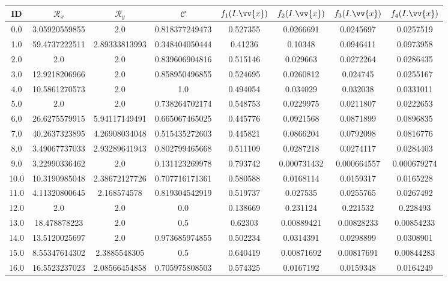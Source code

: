 \scriptsize
\begin{longtable}{|c|c|c|c|c|c|c|c|}
\hline
ID & $\mathscr{R}_x$ & $\mathscr{R}_y$ & $\mathscr{C}$ & $f_1(I.\vv{x})$ & $f_2(I.\vv{x})$ & $f_3(I.\vv{x})$ & $f_4(I.\vv{x})$ \\
\hline
0.0 & 3.05920559855 & 2.0 & 0.818377249473 & 0.527355 & 0.0266691 & 0.0245697 & 0.0257519 \\
1.0 & 59.4737222511 & 2.89333813993 & 0.348404050444 & 0.41236 & 0.10348 & 0.0946411 & 0.0973958 \\
2.0 & 2.0 & 2.0 & 0.839606904816 & 0.515146 & 0.029663 & 0.0272264 & 0.0286435 \\
3.0 & 12.9218206966 & 2.0 & 0.858950496855 & 0.524695 & 0.0260812 & 0.024745 & 0.0255167 \\
4.0 & 10.5861270573 & 2.0 & 1.0 & 0.494054 & 0.034029 & 0.032038 & 0.0331011 \\
5.0 & 2.0 & 2.0 & 0.738264702174 & 0.548753 & 0.0229975 & 0.0211807 & 0.0222653 \\
6.0 & 26.6275579915 & 5.94117149491 & 0.665067465025 & 0.445776 & 0.0921568 & 0.0871899 & 0.0896835 \\
7.0 & 40.2637323895 & 4.26908034048 & 0.515435272603 & 0.445821 & 0.0866204 & 0.0792098 & 0.0816776 \\
8.0 & 3.49067737033 & 2.93289641943 & 0.802799465668 & 0.511109 & 0.0287218 & 0.0274117 & 0.0284403 \\
9.0 & 3.22990336462 & 2.0 & 0.131123269978 & 0.793742 & 0.000731432 & 0.000664557 & 0.000679274 \\
10.0 & 10.3190985048 & 2.38672127726 & 0.707716171361 & 0.580588 & 0.0168114 & 0.0159317 & 0.0165228 \\
11.0 & 4.11320800645 & 2.168574578 & 0.819304542919 & 0.519737 & 0.027535 & 0.0255765 & 0.0267492 \\
12.0 & 2.0 & 2.0 & 0.0 & 0.138669 & 0.231124 & 0.221532 & 0.228493 \\
13.0 & 18.478878223 & 2.0 & 0.5 & 0.62303 & 0.00889421 & 0.00828233 & 0.00854233 \\
14.0 & 13.5120025697 & 2.0 & 0.973685974855 & 0.502234 & 0.0314391 & 0.0298899 & 0.0308901 \\
15.0 & 8.55347614302 & 2.3885548305 & 0.5 & 0.640419 & 0.00871692 & 0.00817691 & 0.00844283 \\
16.0 & 16.5523237023 & 2.08566454858 & 0.705975808503 & 0.574325 & 0.0167192 & 0.0159348 & 0.0164249 \\

\end{longtable}
